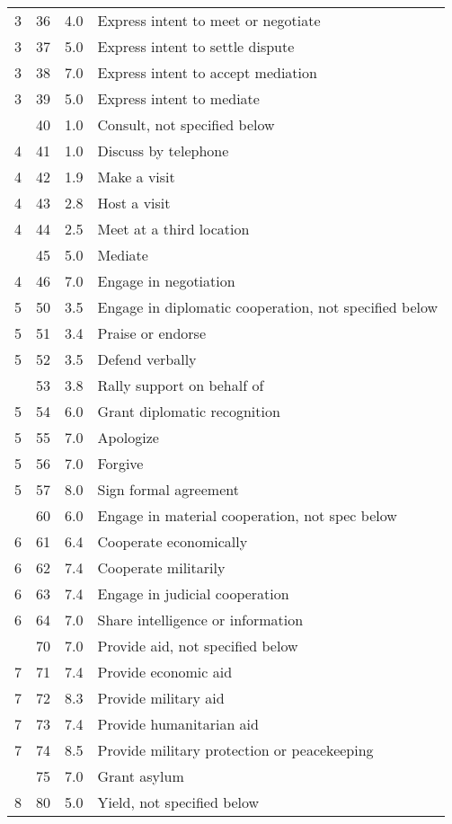 \documentclass[10pt,]{article}
\begin{document}
\begin{longtable}[t]{rrrl}
3 & 36 & 4.0 & Express intent to meet or negotiate\\
3 & 37 & 5.0 & Express intent to settle dispute\\
3 & 38 & 7.0 & Express intent to accept mediation\\
3 & 39 & 5.0 & Express intent to mediate\\
\addlinespace
4 & 40 & 1.0 & Consult, not specified below\\
4 & 41 & 1.0 & Discuss by telephone\\
4 & 42 & 1.9 & Make a visit\\
4 & 43 & 2.8 & Host a visit\\
4 & 44 & 2.5 & Meet at a third location\\
\addlinespace
4 & 45 & 5.0 & Mediate\\
4 & 46 & 7.0 & Engage in negotiation\\
5 & 50 & 3.5 & Engage in diplomatic cooperation, not specified below\\
5 & 51 & 3.4 & Praise or endorse\\
5 & 52 & 3.5 & Defend verbally\\
\addlinespace
5 & 53 & 3.8 & Rally support on behalf of\\
5 & 54 & 6.0 & Grant diplomatic recognition\\
5 & 55 & 7.0 & Apologize\\
5 & 56 & 7.0 & Forgive\\
5 & 57 & 8.0 & Sign formal agreement\\
\addlinespace
6 & 60 & 6.0 & Engage in material cooperation, not spec below\\
6 & 61 & 6.4 & Cooperate economically\\
6 & 62 & 7.4 & Cooperate militarily\\
6 & 63 & 7.4 & Engage in judicial cooperation\\
6 & 64 & 7.0 & Share intelligence or information\\
\addlinespace
7 & 70 & 7.0 & Provide aid, not specified below\\
7 & 71 & 7.4 & Provide economic aid\\
7 & 72 & 8.3 & Provide military aid\\
7 & 73 & 7.4 & Provide humanitarian aid\\
7 & 74 & 8.5 & Provide military protection or peacekeeping\\
\addlinespace
7 & 75 & 7.0 & Grant asylum\\
8 & 80 & 5.0 & Yield, not specified below\\

\end{longtable}
\end{document}
